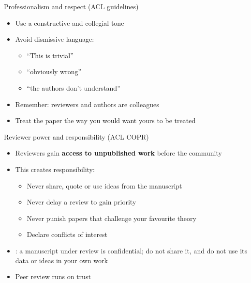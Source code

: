 \documentclass[aspectratio=169]{beamer}
\begin{document}
\begin{frame}{Professionalism and respect (ACL guidelines)}
\begin{itemize}
  \item Use a constructive and collegial tone
  \item Avoid dismissive language:
    \begin{itemize}
      \item ``This is trivial''
      \item ``obviously wrong''
      \item ``the authors don't understand''
    \end{itemize}
  \item Remember: reviewers and authors are colleagues
  \item Treat the paper the way you would want yours to be treated
\end{itemize}

\end{frame}


\begin{frame}{Reviewer power and responsibility (ACL COPR)}
\begin{itemize}
  \item Reviewers gain \textbf{access to unpublished work} before the community
  \item This creates responsibility:
    \begin{itemize}
      \item Never share, quote or use ideas from the manuscript
      \item Never delay a review to gain priority
      \item Never punish papers that challenge your favourite theory
      \item Declare conflicts of interest
    \end{itemize}
  \item \citet{rockwell2005prethics}: a manuscript under review is confidential; do not share it, and do not use its data or ideas in your own work
  \item Peer review runs on trust
\end{itemize}

\end{frame}

\end{document}
